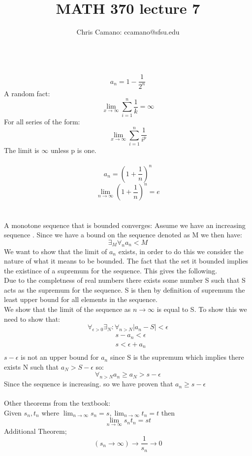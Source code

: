 \documentclass[11pt]{article}
\author{Chris Camano: ccamano@sfsu.edu}
\title{MATH 370  lecture 7 }
\date
\theoremstyle{definition}  %
\newcommand{\xlim}{\lim_{x\rightarrow\infty}}
\begin{document}
\maketitle
   \\
  \[
    a_n=1-\frac{1}{2^n}
  \]
A random fact:
\[
  \xlim \sum_{i=1}^n\frac{1}{k}=\infty
\]
For all series of the form:
\[
  \xlim \sum_{i=1}^n\frac{1}{i^p}
\]
The limit is $\infty$ unless p is one. \\\\

$$a_n=(1+\frac{1}{n})^n$$
\newcommand{\nlim}{\lim_{n\rightarrow \infty}}
\[
  \nlim (1+\frac{1}{n})^n=e
\]\\\\

\theorem
A monotone sequence that is bounded converges: Assume we have an increasing sequence . Since we have a bound on the sequence denoted as M we then have:
\[
  \exists_M \forall_n a_n< M
\]
We want to show that the limit of $a_n$ exists, in order to do this we consider the nature of what it means to be bounded. The fact that the set it bounded implies the existince of a supremum for the sequence. This gives the following. \\
Due to the completness of real numbers there exists some number S such that S acts as the supremum for the sequence. S is then by definition of supremum the least upper bound for all elements in the sequence. \\
We show that the limit of the sequence as $n\rightarrow \infty$ is equal to S. To show this we need to show that:
\[
  \forall_{\epsilon >0}\exists_N:\forall_{n>N}|a_n-S|<\epsilon
\]
\begin{align*}
  &s-a_n<\epsilon\\
  &s<\epsilon+a_n\\
\end{align*}
$s-\epsilon$ is not an
upper bound for $a_n$ since S is the supremum which implies there exists N such that $a_N> S-\epsilon$ so:
\[
  \forall_{n>N}a_n\geq a_N >s-\epsilon
\]
Since the sequence is increasing. so we have proven that $a_n\geq s-\epsilon$\\\\
Other theorems from the textbook:
\\
Given $s_n,t_n$ where $\nlim s_n=s,\nlim t_n=t$ then
\[
  \nlim s_nt_n=st
\]
Additional Theorem;
\[
  (s_n\rightarrow \infty) \rightarrow \frac{1}{s_n}\rightarrow 0
\]
\end{document}
